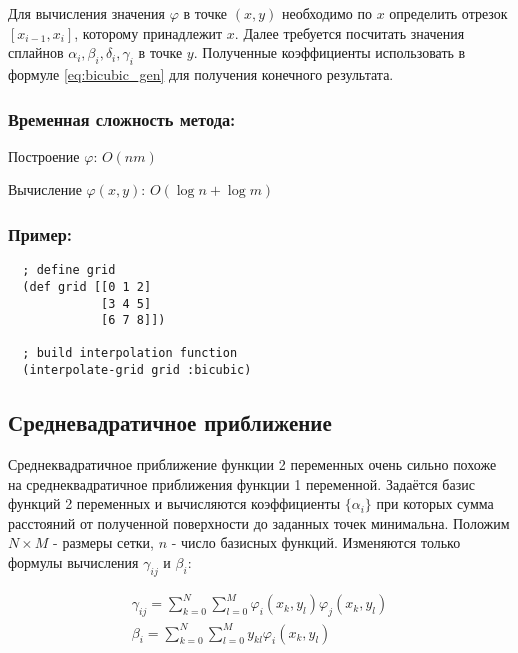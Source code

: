 Для вычисления значения $\varphi$ в точке $(x,y)$ необходимо по $x$ определить отрезок $[x_{i-1}, x_i]$, которому принадлежит $x$. Далее требуется посчитать значения сплайнов $\alpha_i, \beta_i, \delta_i, \gamma_i$ в точке $y$. Полученные коэффициенты использовать в формуле \eqref{eq:bicubic_gen} для получения конечного результата.

\subsubsection{Временная сложность метода:}

Построение $\varphi$: $O(n m)$

Вычисление $\varphi(x, y)$: $O(\log{n} + \log{m})$

\subsubsection{Пример:}
\begin{samepage}
\begin{verbatim}
  ; define grid
  (def grid [[0 1 2]
             [3 4 5]
             [6 7 8]])

  ; build interpolation function
  (interpolate-grid grid :bicubic)
\end{verbatim}
\end{samepage}


\subsection{Средневадратичное приближение}

Среднеквадратичное приближение функции 2 переменных очень сильно похоже на среднеквадратичное приближения функции 1 переменной. Задаётся базис функций 2 переменных и вычисляются коэффициенты $\{\alpha_i\}$ при которых сумма расстояний от полученной поверхности до заданных точек минимальна. Положим $N \times M$ - размеры сетки, $n$ - число базисных функций. Изменяются только формулы вычисления $\gamma_{ij}$ и $\beta_i$:

\begin{equation}
  \begin{gathered}
    \gamma_{ij} = \sum^N_{k=0}\sum^M_{l=0} \varphi_i(x_k,y_l) \varphi_j(x_k,y_l) \\
    \beta_i = \sum^N_{k=0}\sum^M_{l=0} y_{kl} \varphi_i(x_k,y_l)
  \end{gathered}
\end{equation}

